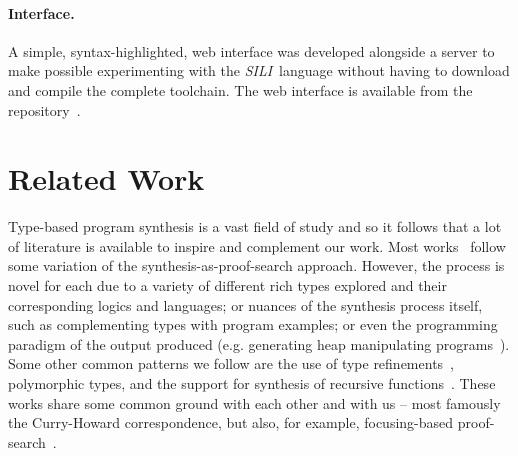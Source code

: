 \documentclass{llncs}
\newcommand{\mypara}[1]{\paragraph{\textbf{#1}.}}
\newcommand{\synname}{\emph{SILI}}
\begin{document}
\mypara{Interface} A simple, syntax-highlighted, web interface was developed
alongside a server to make possible experimenting with the \synname\ 
language without having to download and compile the complete toolchain. The web
interface is available from the repository~\cite{github repo}.





\section{Related Work}

Type-based program synthesis is a vast field of study and so it follows that a
lot of literature is available to inspire and complement our work. Most
works~\cite{DBLP:conf/lopstr/HughesO20,DBLP:conf/pldi/PolikarpovaKS16,DBLP:conf/pldi/OseraZ15,DBLP:conf/popl/FrankleOWZ16}
follow some variation of the synthesis-as-proof-search approach. However, the
process is novel for each due to a variety of different rich types explored and
their corresponding logics and languages; or nuances of the synthesis process
itself, such as complementing types with program examples; or even the
programming paradigm of the output produced (e.g. generating heap manipulating
programs~\cite{DBLP:journals/pacmpl/PolikarpovaS19}).  Some other common
patterns we follow are the use of type
refinements~\cite{DBLP:conf/pldi/PolikarpovaKS16}, polymorphic types, and the
support for synthesis of recursive
functions~\cite{DBLP:conf/pldi/PolikarpovaKS16,DBLP:conf/pldi/OseraZ15}. These
works share some common ground with each other and with us -- most
famously the Curry-Howard correspondence, but also, for example, 
focusing-based proof-search~\cite{10.1093/logcom/2.3.297}.

\end{document}
